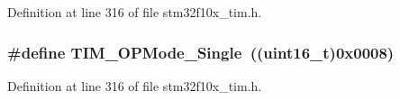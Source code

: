 Definition at line 316 of file stm32f10x\+\_\+tim.\+h.

\subsubsection[{\texorpdfstring{T\+I\+M\+\_\+\+O\+P\+Mode\+\_\+\+Single}{TIM_OPMode_Single}}]{\setlength{\rightskip}{0pt plus 5cm}\#define T\+I\+M\+\_\+\+O\+P\+Mode\+\_\+\+Single~(({\bf uint16\+\_\+t})0x0008)}\hypertarget{group___t_i_m___one___pulse___mode_ga99d934fdbc54ea4ee2cf5c86860f9227}{}\label{group___t_i_m___one___pulse___mode_ga99d934fdbc54ea4ee2cf5c86860f9227}


Definition at line 316 of file stm32f10x\+\_\+tim.\+h.


